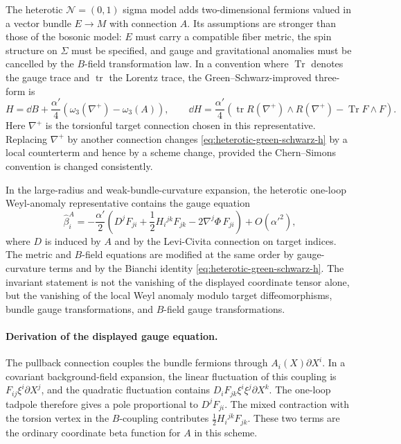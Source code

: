 The heterotic \(\mathcal N=(0,1)\) sigma model adds two-dimensional fermions
valued in a vector bundle \(E\to M\) with connection \(A\).  Its assumptions
are stronger than those of the bosonic model: \(E\) must carry a compatible
fiber metric, the spin structure on \(\Sigma\) must be specified, and gauge and
gravitational anomalies must be cancelled by the \(B\)-field transformation
law.  In a convention where \(\operatorname{Tr}\) denotes the gauge trace and
\(\operatorname{tr}\) the Lorentz trace, the Green--Schwarz-improved
three-form is
\begin{equation}
  H
  =
  \dd B
  +
  \frac{\alpha'}4
  \left(
    \omega_3(\nabla^+)-\omega_3(A)
  \right),
  \qquad
  \dd H
  =
  \frac{\alpha'}4
  \left(
    \operatorname{tr}R(\nabla^+)\wedge R(\nabla^+)
    -\operatorname{Tr}F\wedge F
  \right).
  \label{eq:heterotic-green-schwarz-h}
\end{equation}
Here \(\nabla^+\) is the torsionful target connection chosen in this
representative.  Replacing \(\nabla^+\) by another connection changes
\eqref{eq:heterotic-green-schwarz-h} by a local counterterm and hence by a
scheme change, provided the Chern--Simons convention is changed
consistently.

\begin{controlledapproximation}
\label{capprox:heterotic-one-loop-beta-representative}
In the large-radius and weak-bundle-curvature expansion, the heterotic
one-loop Weyl-anomaly representative contains the gauge equation
\begin{equation}
  \widehat\beta^A_i
  =
  -\frac{\alpha'}2
  \left(
    D^jF_{ji}
    +\frac12H_i{}^{jk}F_{jk}
    -2\nabla^j\Phi\,F_{ji}
  \right)
  +O(\alpha'^2),
  \label{eq:heterotic-gauge-beta-one-loop}
\end{equation}
where \(D\) is induced by \(A\) and by the Levi-Civita connection on target
indices.  The metric and \(B\)-field equations are modified at the same
order by gauge-curvature terms and by the Bianchi identity
\eqref{eq:heterotic-green-schwarz-h}.  The invariant statement is not the
vanishing of the displayed coordinate tensor alone, but the vanishing of the
local Weyl anomaly modulo target diffeomorphisms, bundle gauge
transformations, and \(B\)-field gauge transformations.
\end{controlledapproximation}

\paragraph{Derivation of the displayed gauge equation.}
The pullback connection couples the bundle fermions through
\(A_i(X)\partial X^i\).  In a covariant background-field expansion, the
linear fluctuation of this coupling is \(F_{ij}\xi^i\partial X^j\), and the
quadratic fluctuation contains \(D_iF_{jk}\xi^i\xi^j\partial X^k\).  The
one-loop tadpole therefore gives a pole proportional to \(D^jF_{ji}\).  The
mixed contraction with the torsion vertex in the \(B\)-coupling contributes
\(\frac12H_i{}^{jk}F_{jk}\).  These two terms are the ordinary coordinate
beta function for \(A\) in this scheme.

